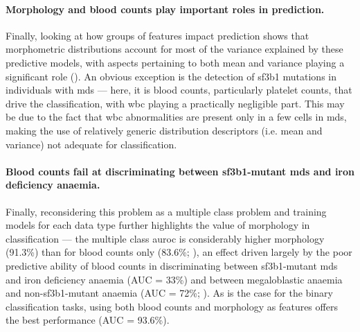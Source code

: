 \paragraph{Morphology and blood counts play important roles in prediction.} Finally, looking at how groups of features impact prediction shows that morphometric distributions account for most of the variance explained by these predictive models, with aspects pertaining to both mean and variance playing a significant role (). An obvious exception is the detection of \ac{sf3b1} mutations in individuals with \ac{mds} --- here, it is blood counts, particularly platelet counts, that drive the classification, with \ac{wbc} playing a practically negligible part. This may be due to the fact that \ac{wbc} abnormalities are present only in a few cells in \ac{mds}, making the use of relatively generic distribution descriptors (i.e. mean and variance) not adequate for classification.

\begin{figure}[!ht]
    \label{fig:feature-group-importance}
\end{figure}

\paragraph{Blood counts fail at discriminating between \ac{sf3b1}-mutant \ac{mds} and iron deficiency anaemia.} Finally, reconsidering this problem as a multiple class problem and training models for each data type further highlights the value of morphology in classification --- the multiple class \ac{auroc} is considerably higher morphology (91.3\%) than for blood counts only (83.6\%; ), an effect driven largely by the poor predictive ability of blood counts in discriminating between \ac{sf3b1}-mutant \ac{mds} and iron deficiency anaemia (AUC = 33\%) and between megaloblastic anaemia and non-\ac{sf3b1}-mutant anaemia (AUC = 72\%; ). As is the case for the binary classification tasks, using both blood counts and morphology as features offers the best performance (AUC = 93.6\%).

\begin{figure}[!ht]
    \label{fig:multiclass-auc}
\end{figure}


